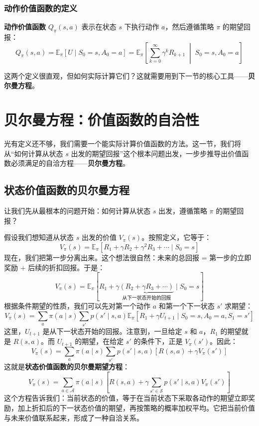 \documentclass[lang=cn,zihao=-4,a4paper,fontset=windows]{beautybook}
\begin{document}
\subsubsection{动作价值函数的定义}

\textbf{动作价值函数} $Q_\pi(s,a)$ 表示在状态 $s$ 下执行动作 $a$，然后遵循策略 $\pi$ 的期望回报：
\[
Q_\pi(s,a) = \mathbb{E}_\pi\left[ U \mid S_0=s, A_0=a \right]
= \mathbb{E}_\pi\left[ \sum_{k=0}^{\infty} \gamma^k R_{k+1} \;\middle|\; S_0=s, A_0=a \right]
\]

这两个定义很直观，但如何实际计算它们？这就需要用到下一节的核心工具——\textbf{贝尔曼方程}。

\section{贝尔曼方程：价值函数的自洽性}

光有定义还不够，我们需要一个能实际计算价值函数的方法。这一节，我们将从“如何计算从状态 $s$ 出发的期望回报”这个根本问题出发，一步步推导出价值函数必须满足的自洽方程——\textbf{贝尔曼方程}。

\subsection{状态价值函数的贝尔曼方程}

让我们先从最根本的问题开始：如何计算从状态 $s$ 出发，遵循策略 $\pi$ 的期望回报？

假设我们想知道从状态 $s$ 出发的价值 $V_\pi(s)$。按照定义，它等于：
\[
V_\pi(s) = \mathbb{E}_\pi\left[ R_1 + \gamma R_2 + \gamma^2 R_3 + \cdots \mid S_0 = s \right]
\]
现在，我们把第一步分离出来。这个想法很自然：未来的总回报 = 第一步的立即奖励 + 后续的折扣回报。于是：
\[
V_\pi(s) = \mathbb{E}_\pi\left[ R_1 + \gamma \underbrace{(R_2 + \gamma R_3 + \cdots)}_{\text{从下一状态开始的回报}} \mid S_0 = s \right]
\]
根据条件期望的性质，我们可以先对第一个动作 $a$ 和第一个下一状态 $s'$ 求期望：
\[
V_\pi(s) = \sum_{a} \pi(a\mid s) \sum_{s'} p(s'\mid s,a) \mathbb{E}_\pi\left[ R_1 + \gamma U_{t+1} \mid S_0=s, A_0=a, S_1=s' \right]
\]
这里，$U_{t+1}$ 是从下一状态开始的回报。注意到，一旦给定 $s$ 和 $a$，$R_1$ 的期望就是 $R(s,a)$。而 $U_{t+1}$ 的期望，在给定 $s'$ 的条件下，正是 $V_\pi(s')$。因此：
\[
V_\pi(s) = \sum_{a} \pi(a\mid s) \sum_{s'} p(s'\mid s,a) \left[ R(s,a) + \gamma V_\pi(s') \right]
\]
这就是\textbf{状态价值函数的贝尔曼期望方程}：
\[
\boxed{V_\pi(s) = \sum_{a \in \mathcal{A}} \pi(a \mid s) \left[ R(s, a) + \gamma \sum_{s' \in \mathcal{S}} p(s' \mid s, a) V_\pi(s') \right]}
\]
这个方程告诉我们：当前状态的价值，等于在当前状态下采取各动作的期望立即奖励，加上折扣后的下一状态价值的期望，再按策略的概率加权平均。它把当前价值与未来价值联系起来，形成了一种自洽关系。
\end{document}
